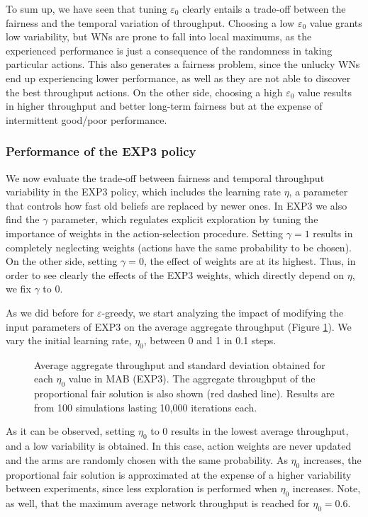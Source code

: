 \documentclass[10pt,journal,compsoc]{IEEEtran}
\begin{document}
	To sum up, we have seen that tuning $\varepsilon_0$ clearly entails a trade-off between the fairness and the temporal variation of throughput. Choosing a low $\varepsilon_0$ value grants low variability, but WNs are prone to fall into local maximums, as the experienced performance is just a consequence of the randomness in taking particular actions. This also generates a fairness problem, since the unlucky WNs end up experiencing lower performance, as well as they are not able to discover the best throughput actions. On the other side, choosing a high $\varepsilon_0$ value results in higher throughput and better long-term fairness but at the expense of intermittent good/poor performance.
	
	\subsubsection{Performance of the EXP3 policy}
	\label{section:exp3_study}
	We now evaluate the trade-off between fairness and temporal throughput variability in the EXP3 policy, which includes the learning rate $\eta$, a parameter that controls how fast old beliefs are replaced by newer ones. In EXP3 we also find the $\gamma$ parameter, which regulates explicit exploration by tuning the importance of weights in the action-selection procedure. Setting $\gamma = 1$ results in completely neglecting weights (actions have the same probability to be chosen). On the other side, setting $\gamma = 0$, the effect of weights are  at its highest. Thus, in order to see clearly the effects of the EXP3 weights, which directly depend on $\eta$, we fix $\gamma$ to 0.
	
	As we did before for $\varepsilon$-greedy, we start analyzing the impact of modifying the input parameters of EXP3 on the average aggregate throughput (Figure \ref{fig:exp3_tuning_parameters}). We vary the initial learning rate, $\eta_0$, between 0 and 1 in 0.1 steps.
	\begin{figure}[t!]
		\centering											
		\caption{Average aggregate throughput and standard deviation obtained for each $\eta_0$ value in MAB (EXP3). The aggregate throughput of the proportional fair solution is also shown (red dashed line). Results are from 100 simulations lasting 10,000 iterations each.}
		\label{fig:exp3_tuning_parameters}
	\end{figure}	
	As it can be observed, setting $\eta_0$ to 0 results in the lowest average throughput, and a low variability is obtained. In this case, action weights are never updated and the arms are randomly chosen with the same probability. As $\eta_0$ increases, the proportional fair solution is approximated at the expense of a higher variability between experiments, since less exploration is performed when $\eta_0$ increases. Note, as well, that the maximum average network throughput is reached for $\eta_0 = 0.6$.
	
\end{document}
